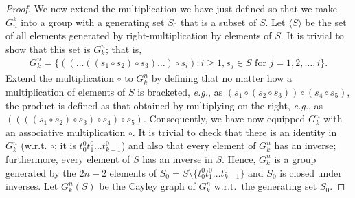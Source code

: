 \documentclass{article}
\begin{document}
\begin{proof}
We now extend the multiplication we have just defined so that we make $G_n^k$ into a group with a generating set $S_0$ that is a subset of $S$. Let $\langle S\rangle$ be the set of all elements generated by right-multiplication by elements of $S$. It is trivial to show that this set is $G_k^n$; that is, 
\begin{align*}
G_k^n = \{((\ldots((s_1\circ s_2)\circ s_3) \ldots ) \circ s_i) : i \geq 1, s_j\in S \text{ for } j=1,2,\ldots,i\}.
\end{align*}
Extend the multiplication $\circ$ to $G_k^n$ by defining that no matter how a
multiplication of elements of $S$ is bracketed, \emph{e.g.}, as $(s_1 \circ
(s_2 \circ s_3)) \circ (s_4 \circ s_5)$, the product is defined as that obtained
by multiplying on the right, \emph{e.g.}, as $((((s_1\circ s_2) \circ s_3)
\circ s_4) \circ s_5)$. Consequently, we have now equipped $G_k^n$ with an
associative multiplication $\circ$. It is trivial to check that there is an
identity in $G_k^n$ (w.r.t. $\circ$; it is $t_0^0t_1^0\ldots t_{k-1}^0$) and
also that every element of $G_k^n$ has an inverse; furthermore, every element of
$S$ has an inverse in $S$. Hence, $G_k^n$ is a group generated by the $2n-2$
elements of $S_0 = S\setminus\{t_0^0t_1^0\ldots t_{k-1}^0\}$ and $S_0$ is closed
under inverses. Let $G_k^n(S)$ be the Cayley graph of $G_k^n$ w.r.t.\ the
generating set $S_0$.


\end{proof}
\end{document}
